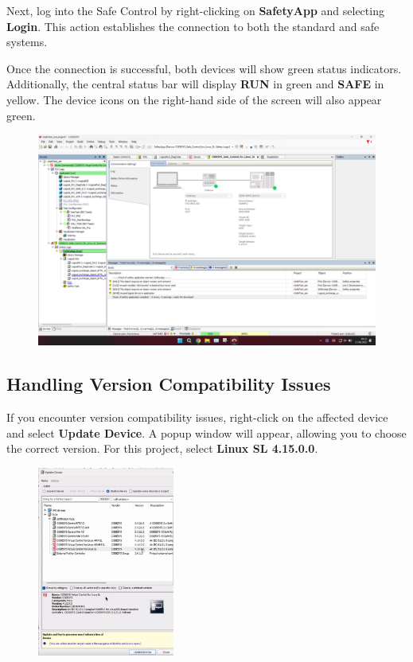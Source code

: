 \documentclass[a4paper,12pt]{article}
\begin{document}
Next, log into the Safe Control by right-clicking on \textbf{SafetyApp} and selecting \textbf{Login}. This action establishes the connection to both the standard and safe systems.

Once the connection is successful, both devices will show green status indicators. Additionally, the central status bar will display \textbf{RUN} in green and \textbf{SAFE} in yellow. The device icons on the right-hand side of the screen will also appear green.

\begin{figure}[H]
	\centering
	\includegraphics[width=\textwidth]{c3.PNG}
\end{figure}

\subsection{Handling Version Compatibility Issues}

If you encounter version compatibility issues, right-click on the affected device and select \textbf{Update Device}. A popup window will appear, allowing you to choose the correct version. For this project, select \textbf{Linux SL 4.15.0.0}.

\begin{figure}[H]
	\centering
	\includegraphics[width=0.4\textwidth]{c4.jpg}
\end{figure}
\end{document}
